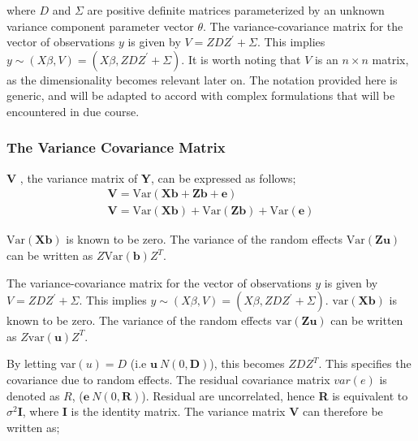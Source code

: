 \documentclass[12pt, a4paper]{report}
\theoremstyle{plain}
\theoremstyle{definition}
\theoremstyle{remark}
\begin{document}
	
	
	
	where $D$ and $\Sigma$ are positive definite matrices parameterized by an unknown variance component parameter vector $ \theta.$ The variance-covariance matrix for the vector of observations $y$ is given by $V = ZDZ^{\prime}+ \Sigma.$ This implies $y \sim(X\beta, V) = (X\beta,ZDZ^{\prime}+ \Sigma)$. It is worth noting that $V$ is an $n \times n$ matrix, as the dimensionality becomes relevant later on. The notation provided here is generic, and will be adapted to accord with complex formulations that will be encountered in due course.
	
	
	
	
	\subsubsection{The Variance Covariance Matrix}
	\textbf{V} , the variance matrix of \textbf{Y}, can be expressed
	as follows;
	\begin{eqnarray}
	\textbf{V}= \textrm{Var} ( \textbf{Xb} + \textbf{Zb} + \textbf{e})\\
	\textbf{V}= \textrm{Var} ( \textbf{Xb} ) + \textrm{Var} (\textbf{Zb}) +
	\textrm{Var}(\textbf{e})
	\end{eqnarray}
	
	$\mbox{Var}(\textbf{Xb})$ is known to be zero. The variance of the
	random effects $\mbox{Var}(\textbf{Zu})$ can be written as
	$Z\mbox{Var}(\textbf{b})Z^{T}$.
	
	
	
	The variance-covariance matrix for the vector of observations $y$ is given by $V = ZDZ^{\prime}+ \Sigma.$ This implies $y \sim(X\beta, V) = (X\beta,ZDZ^{\prime}+ \Sigma)$. $\mbox{var}(\textbf{Xb})$ is known to be zero. The variance of the
	random effects $\mbox{var}(\textbf{Zu})$ can be written as
	$Z\mbox{var}(\textbf{u})Z^{T}$.
	
	
	
	By letting var$(u) = D$ (i.e $\textbf{u} ~ N(0,\textbf{D})$), this becomes $ZDZ^{T}$. This specifies the covariance due to random
	effects. The residual covariance matrix $var(e)$ is denoted as $R$, ($\textbf{e} ~ N(0,\textbf{R})$). Residual are uncorrelated,
	hence \textbf{R} is equivalent to $\sigma^{2}$\textbf{I}, where \textbf{I} is the identity matrix. The variance matrix \textbf{V}
	can therefore be written as;
	
\end{document}
